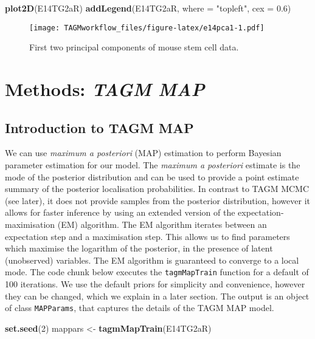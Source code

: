 \documentclass[]{article}
\newenvironment{Shaded}{\begin{snugshade}}{\end{snugshade}}
\newcommand{\KeywordTok}[1]{\textcolor[rgb]{0.13,0.29,0.53}{\textbf{{#1}}}}
\newcommand{\DataTypeTok}[1]{\textcolor[rgb]{0.13,0.29,0.53}{{#1}}}
\newcommand{\DecValTok}[1]{\textcolor[rgb]{0.00,0.00,0.81}{{#1}}}
\newcommand{\FloatTok}[1]{\textcolor[rgb]{0.00,0.00,0.81}{{#1}}}
\newcommand{\StringTok}[1]{\textcolor[rgb]{0.31,0.60,0.02}{{#1}}}
\newcommand{\NormalTok}[1]{{#1}}
\begin{document}
\begin{Shaded}
\begin{Highlighting}[]
\KeywordTok{plot2D}\NormalTok{(E14TG2aR)}
\KeywordTok{addLegend}\NormalTok{(E14TG2aR, }\DataTypeTok{where =} \StringTok{"topleft"}\NormalTok{, }\DataTypeTok{cex =} \FloatTok{0.6}\NormalTok{)}
\end{Highlighting}
\end{Shaded}

\begin{figure}[htbp]
\centering
\texttt{[image: TAGMworkflow\_files/figure-latex/e14pca1-1.pdf]}
\caption{\label{fig:e14pca1}First two principal components of mouse stem
cell data.}
\end{figure}

\newpage

\section{\texorpdfstring{Methods: \emph{TAGM
MAP}}{Methods: TAGM MAP}}\label{methods-tagm-map}

\subsection{Introduction to TAGM MAP}\label{introduction-to-tagm-map}

We can use \emph{maximum a posteriori} (MAP) estimation to perform
Bayesian parameter estimation for our model. The \emph{maximum a
posteriori} estimate is the mode of the posterior distribution and can
be used to provide a point estimate summary of the posterior
localisation probabilities. In contrast to TAGM MCMC (see later), it
does not provide samples from the posterior distribution, however it
allows for faster inference by using an extended version of the
expectation-maximisation (EM) algorithm. The EM algorithm iterates
between an expectation step and a maximisation step. This allows us to
find parameters which maximise the logarithm of the posterior, in the
presence of latent (unobserved) variables. The EM algorithm is
guaranteed to converge to a local mode. The code chunk below executes
the \texttt{tagmMapTrain} function for a default of 100 iterations. We
use the default priors for simplicity and convenience, however they can
be changed, which we explain in a later section. The output is an object
of class \texttt{MAPParams}, that captures the details of the TAGM MAP
model.

\begin{Shaded}
\begin{Highlighting}[]
\KeywordTok{set.seed}\NormalTok{(}\DecValTok{2}\NormalTok{)}
\NormalTok{mappars <-}\StringTok{ }\KeywordTok{tagmMapTrain}\NormalTok{(E14TG2aR)}
\end{Highlighting}
\end{Shaded}
\end{document}
